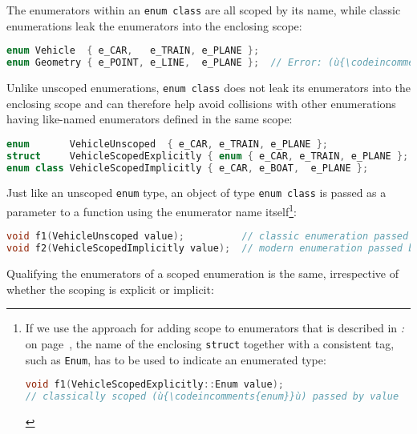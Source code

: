 The enumerators within an \texttt{enum}~\texttt{class} are all scoped by
its name, while classic enumerations leak the enumerators into the
enclosing scope:

\begin{lstlisting}[language=C++]
enum Vehicle  { e_CAR,   e_TRAIN, e_PLANE };
enum Geometry { e_POINT, e_LINE,  e_PLANE };  // Error: (ù{\codeincomments{e\_PLANE}}ù) is redefined.
\end{lstlisting}

\noindent Unlike unscoped enumerations, \texttt{enum}~\texttt{class} does not leak
its enumerators into the enclosing scope and can therefore help avoid
collisions with other enumerations having like-named enumerators defined
in the same scope:

\begin{lstlisting}[language=C++]
enum       VehicleUnscoped  { e_CAR, e_TRAIN, e_PLANE };
struct     VehicleScopedExplicitly { enum { e_CAR, e_TRAIN, e_PLANE }; };
enum class VehicleScopedImplicitly { e_CAR, e_BOAT,  e_PLANE };
\end{lstlisting}

\noindent Just like an unscoped \texttt{enum} type, an object of type
\texttt{enum}~\texttt{class} is passed as a parameter to a function
using the enumerator name itself{\cprotect\footnote{If we use the approach for
adding scope to enumerators that is described in \textit{: } on page~\pageref{drawbacks-relating-to-weakly-typed,-c++03-enumerators}, the name of the enclosing \texttt{struct} together with a
consistent tag, such as \texttt{Enum}, has to be used to indicate an
enumerated type:

\begin{lstlisting}[language=C++, basicstyle={\ttfamily\footnotesize}]
void f1(VehicleScopedExplicitly::Enum value);
// classically scoped (ù{\codeincomments{enum}}ù) passed by value
\end{lstlisting}
}}:

\begin{lstlisting}[language=C++]
void f1(VehicleUnscoped value);          // classic enumeration passed by value
void f2(VehicleScopedImplicitly value);  // modern enumeration passed by value
\end{lstlisting}

\noindent Qualifying the enumerators of a scoped enumeration is the same,
irrespective of whether the scoping is explicit or implicit:

